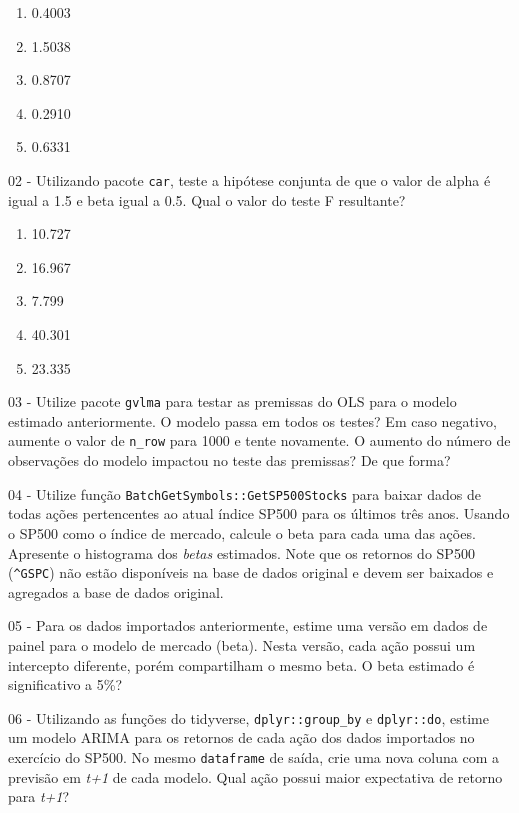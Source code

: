 \documentclass[
  11pt,
]{book}
\providecommand{\tightlist}{%
  \setlength{\itemsep}{0pt}\setlength{\parskip}{0pt}}
\begin{document}
\begin{enumerate}
\def\labelenumi{\alph{enumi})}
\tightlist
\item
  0.4003
\item
  1.5038
\item
  0.8707
\item
  0.2910
\item
  0.6331
\end{enumerate}

02 -
Utilizando pacote \texttt{car}, teste a hipótese conjunta de que o valor de alpha é igual a 1.5 e beta igual a 0.5. Qual o valor do teste F resultante?

\begin{enumerate}
\def\labelenumi{\alph{enumi})}
\tightlist
\item
  10.727
\item
  16.967
\item
  7.799
\item
  40.301
\item
  23.335
\end{enumerate}

03 -
Utilize pacote \texttt{gvlma} para testar as premissas do OLS para o modelo estimado anteriormente. O modelo passa em todos os testes? Em caso negativo, aumente o valor de \texttt{n\_row} para 1000 e tente novamente. O aumento do número de observações do modelo impactou no teste das premissas? De que forma?

04 -
Utilize função \texttt{BatchGetSymbols::GetSP500Stocks} para baixar dados de todas ações pertencentes ao atual índice SP500 para os últimos três anos. Usando o SP500 como o índice de mercado, calcule o beta para cada uma das ações. Apresente o histograma dos \emph{betas} estimados. Note que os retornos do SP500 (\texttt{\textquotesingle{}\^{}GSPC\textquotesingle{}}) não estão disponíveis na base de dados original e devem ser baixados e agregados a base de dados original.

05 -
Para os dados importados anteriormente, estime uma versão em dados de painel para o modelo de mercado (beta). Nesta versão, cada ação possui um intercepto diferente, porém compartilham o mesmo beta. O beta estimado é significativo a 5\%?

06 -
Utilizando as funções do tidyverse, \texttt{dplyr::group\_by} e \texttt{dplyr::do}, estime um modelo ARIMA para os retornos de cada ação dos dados importados no exercício do SP500. No mesmo \texttt{dataframe} de saída, crie uma nova coluna com a previsão em \emph{t+1} de cada modelo. Qual ação possui maior expectativa de retorno para \emph{t+1}?
\end{document}
